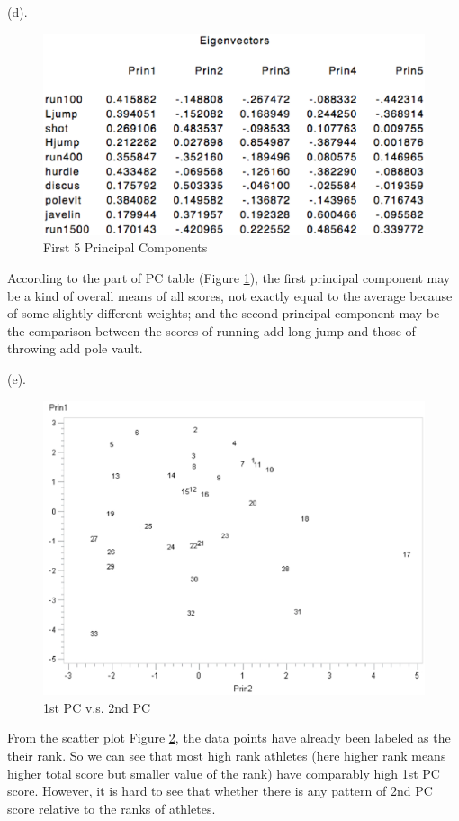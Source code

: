 \documentclass[letterpaper, 12pt]{article}
\begin{document}
(d). 
\begin{figure}[htbp]
\centering\includegraphics[width=5in]{7-2.eps}
\caption{First 5 Principal Components}\label{2}
\end{figure}
According to the part of PC table (Figure \ref{2}), the first principal component may be a kind of overall means of all scores, not exactly equal to the average because of some slightly different weights; and the second principal component may be the comparison between the scores of running add long jump and those of throwing add pole vault. 


(e). \begin{figure}[htbp]
\centering\includegraphics[width=5in]{7-3.eps}
\caption{1st PC v.s. 2nd PC}\label{3}
\end{figure}

From the scatter plot Figure \ref{3}, the data points have already been labeled as the their rank. So we can see that most high rank athletes (here higher rank means higher total score but smaller value of the rank) have comparably high 1st PC score. However, it is hard to see that whether there is any pattern of 2nd PC score relative to the ranks of athletes. 
\end{document}
